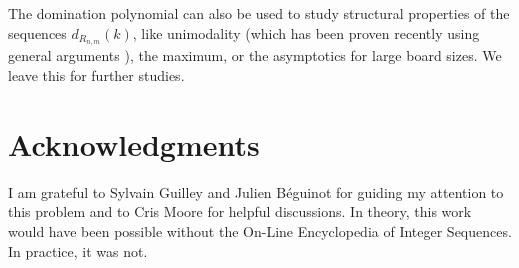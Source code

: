 \documentclass[12pt,reqno]{article}
\begin{document}
The domination polynomial can also be used to study structural
properties of the sequences $d_{R_{n,m}}(k)$, like unimodality (which
has been proven recently using general arguments
\cite{burcroff:obrien:23}), the maximum,
or the asymptotics for large board sizes. We
leave this for further studies.


\section{Acknowledgments}

I am grateful to Sylvain Guilley and Julien B\'{e}guinot for guiding
my attention to this problem and to Cris Moore for helpful
discussions.  In theory, this work would have been possible without
the On-Line Encyclopedia of Integer Sequences. In practice, it was
not.
\end{document}
